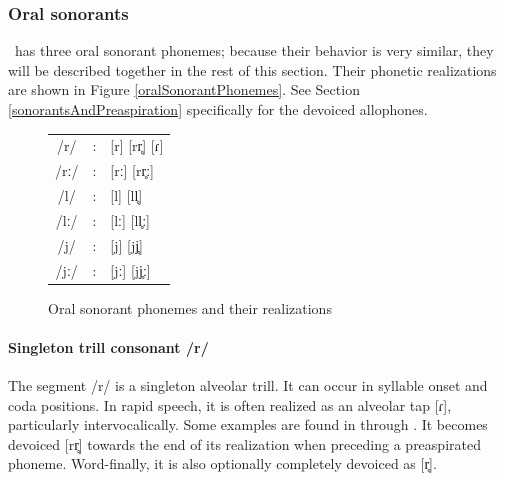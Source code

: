 \subsubsection{Oral sonorants}\label{oralSonorants}%
\PS\ has three oral sonorant phonemes; %
because their behavior is very similar, they will be described together in the rest of this section. 
Their phonetic realizations are shown in Figure \vref{oralSonorantPhonemes}. See Section \ref{sonorantsAndPreaspiration} specifically for the devoiced allophones.
\begin{figure}\centering
\begin{tabular}{c c l}
/r/ &:& [r] [rr̥] [ɾ]\\ %
/rː/ &:& [rː] [rr̥ː] \\ %
/l/ &:& [l] [ll̥]\\ %
/lː/ &:& [lː] [ll̥ː]\\ %
/j/ &:& [j] [jj̥] \\ %
/jː/ &:& [jː] [jj̥ː] \\ %
\end{tabular}
\caption{Oral sonorant phonemes and their realizations}\label{oralSonorantPhonemes}%
\end{figure}


\paragraph{Singleton trill consonant /r/}
The segment /r/ is a singleton alveolar trill. It can occur in syllable onset and coda positions. %
In rapid speech, it is often realized as an alveolar tap [ɾ], particularly intervocalically. Some examples are found in  through . It becomes devoiced [rr̥] towards the end of its realization when preceding a preaspirated phoneme. Word-finally, it is also optionally completely devoiced as [r̥].%

